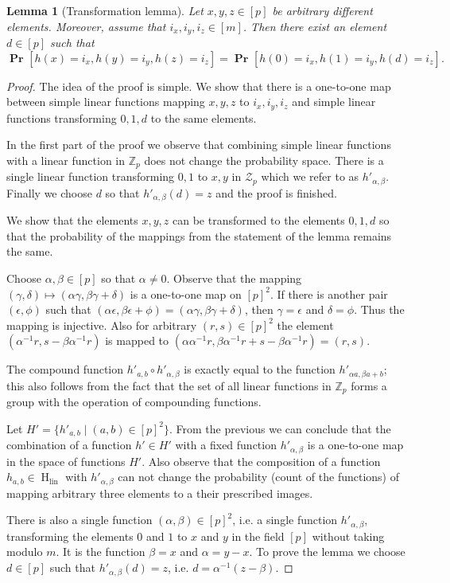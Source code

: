 \documentclass{article}
\newcommand{\hlin}{\operatorname{H}_{\operatorname{lin}}}
\newcommand{\probs}[2]{\operatorname{\mathbf{Pr}}_{{#1}}\left[{#2}\right]}
\newcommand{\prob}[1]{\probs{}{#1}}
\newtheorem{lemma}{Lemma}
\begin{document}
\begin{lemma}[Transformation lemma]
\label{lemma:transformation}
Let $x, y, z \in [p]$ be arbitrary different elements. Moreover, assume that $i_x, i_y, i_z \in [m]$. Then there exist an element $d \in [p]$ such that
\[
\prob{h(x) = i_x, h(y) = i_y,  h(z) = i_z} = \prob{h(0) = i_x, h(1) = i_y, h(d) = i_z}.
\]
\end{lemma}
\begin{proof}
The idea of the proof is simple. We show that there is a one-to-one map between simple linear functions mapping $x, y, z$ to $i_x, i_y, i_z$ and simple linear functions transforming $0, 1, d$ to the same elements.

In the first part of the proof we observe that combining simple linear functions with a linear function in $\mathbb{Z}_p$ does not change the probability space.
There is a single linear function transforming $0, 1$ to $x, y$ in $\mathcal{Z}_p$ which we refer to as $h'_{\alpha,\beta}$.
Finally we choose $d$ so that $h'_{\alpha, \beta}(d) = z$ and the proof is finished.

We show that the elements $x, y, z$ can be transformed to the elements $0, 1, d$ so that the probability of the mappings from the statement of the lemma remains the same.

Choose $\alpha, \beta \in [p]$ so that $\alpha \neq 0$.
Observe that the mapping $(\gamma, \delta) \mapsto (\alpha \gamma, \beta \gamma + \delta)$ is a one-to-one map on $[p]^2$.
If there is another pair $(\epsilon, \phi)$ such that $(\alpha \epsilon, \beta \epsilon + \phi) = (\alpha \gamma, \beta \gamma + \delta)$, then $\gamma = \epsilon$ and $\delta = \phi$. Thus the mapping is injective.
Also for arbitrary $(r, s) \in [p]^2$ the element $(\alpha^{-1}r, s - \beta\alpha^{-1}r)$ is mapped to $(\alpha \alpha^{-1}r, \beta \alpha^{-1} r + s - \beta\alpha^{-1}r) = (r, s)$.

The compound function $h'_{a, b} \circ h'_{\alpha, \beta}$ is exactly equal to the function $h'_{\alpha a, \beta a + b}$; this also follows from the fact that the set of all linear functions in $\mathbb{Z}_p$ forms a group with the operation of compounding functions. 

Let $H' = \{h'_{a, b} \mid (a, b) \in [p]^2\}$.
From the previous we can conclude that the combination of a function $h' \in H'$ with a fixed function $h'_{\alpha, \beta}$ is a one-to-one map in the space of functions $H'$.
Also observe that the composition of a function $h_{a, b} \in \hlin$ with $h'_{\alpha, \beta}$ can not change the probability (count of the functions) of mapping arbitrary three elements to a their prescribed images.

There is also a single function $(\alpha, \beta) \in [p] ^ 2$, i.e. a single function $h'_{\alpha, \beta}$, transforming the elements $0$ and $1$ to $x$ and $y$ in the field $[p]$ without taking modulo $m$. It is the function $\beta = x$ and $\alpha = y - x$.
To prove the lemma we choose $d \in [p]$ such that $h'_{\alpha, \beta}(d) = z$, i.e. $d = \alpha ^ {-1}(z - \beta)$.
\end{proof}
\end{document}
